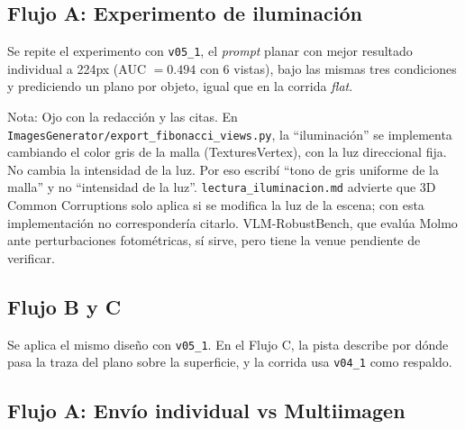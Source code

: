 \newpage


























\newpage
\subsection{Flujo A: Experimento de iluminación}

Se repite el experimento con \texttt{v05\_1}, el \textit{prompt} planar con mejor
resultado individual a 224px (AUC $=0.494$ con 6 vistas), bajo las mismas tres
condiciones y prediciendo un plano por objeto, igual que en la corrida
\textit{flat}.

Nota: Ojo con la redacción y las citas. En \texttt{ImagesGenerator/export\_fibonacci\_views.py}, la ``iluminación'' se implementa cambiando el color gris de la malla (TexturesVertex), con la luz direccional fija. No cambia la intensidad de la luz. Por eso escribí ``tono de gris uniforme de la malla'' y no ``intensidad de la luz''. \texttt{lectura\_iluminacion.md} advierte que 3D Common Corruptions solo aplica si se modifica la luz de la escena; con esta implementación no correspondería citarlo. VLM-RobustBench, que evalúa Molmo ante perturbaciones fotométricas, sí sirve, pero tiene la venue pendiente de verificar.






\newpage
\subsection{Flujo B y C}

Se aplica el mismo diseño con \texttt{v05\_1}. En el Flujo C, la pista describe por
dónde pasa la traza del plano sobre la superficie, y la corrida usa
\texttt{v04\_1} como respaldo.







\newpage

\subsection{Flujo A: Envío individual vs Multiimagen}

